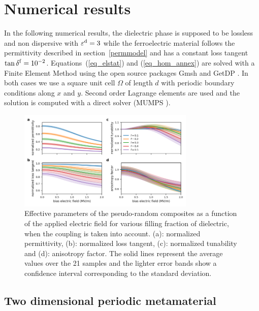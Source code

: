\documentclass[%
 aip,
 amsmath,amssymb,
 reprint,%
linenumbers
]{revtex4-1}
\newcommand{\epsd}{\varepsilon^{\rm d}}
\begin{document}
\section{Numerical results}
In the following numerical results, the dielectric phase is supposed to be
lossless and non dispersive with $\epsd = 3$ while the ferroelectric material follows the
permittivity described in section~\ref{permmodel} and has a constant loss
tangent $\tan \delta^{\rm f} = 10^{-2}$.
Equations~(\ref{eq_elstat}) and (\ref{eq_hom_annex}) are solved with a Finite Element
Method using the open source packages Gmsh \cite{geuzaine_gmsh:_2009} and GetDP \cite{dular_general_1998}.
In both cases we use a square unit cell $\Omega$ of length $d$ with periodic boundary
conditions along $x$ and $y$. Second order Lagrange elements are used and the
solution is computed with a direct solver (MUMPS \cite{amestoy_fully_2001}).

\begin{figure}[!t]
 \centering
 \includegraphics[width=0.75\textwidth]{effpar_rand_cpl.png}
 \caption{Effective parameters of the pseudo-random composites as a function of the
  applied electric field for various filling fraction of dielectric, when the
  coupling is taken into account.
  (a): normalized permittivity, (b): normalized loss tangent, (c): normalized tunability and
  (d): anisotropy factor. The solid lines represent the average values
  over the 21 samples and the lighter error bands show a confidence interval corresponding to
  the standard deviation.}
 \label{eff_par_2Drand_TM}
\end{figure}
%
%
%


\subsection{Two dimensional periodic metamaterial}
\end{document}
